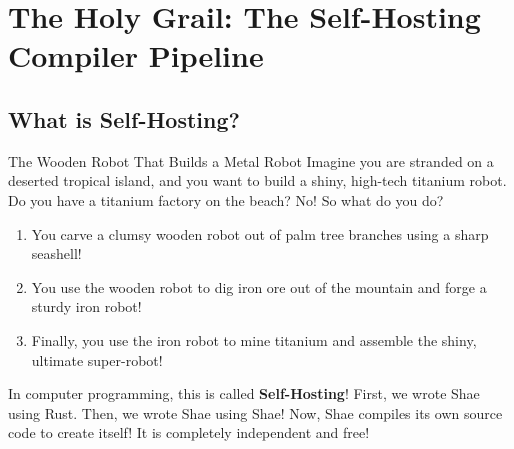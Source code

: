 \chapter{The Holy Grail: The Self-Hosting Compiler Pipeline}

\section{What is Self-Hosting?}

\begin{kidbox}{The Wooden Robot That Builds a Metal Robot}
Imagine you are stranded on a deserted tropical island, and you want to build a shiny, high-tech titanium robot.
Do you have a titanium factory on the beach? No!
So what do you do?
\begin{enumerate}
    \item You carve a clumsy wooden robot out of palm tree branches using a sharp seashell!
    \item You use the wooden robot to dig iron ore out of the mountain and forge a sturdy iron robot!
    \item Finally, you use the iron robot to mine titanium and assemble the shiny, ultimate super-robot!
\end{enumerate}
In computer programming, this is called \textbf{Self-Hosting}!
First, we wrote Shae using Rust. Then, we wrote Shae using Shae!
Now, Shae compiles its own source code to create itself! It is completely independent and free!
\end{kidbox}

